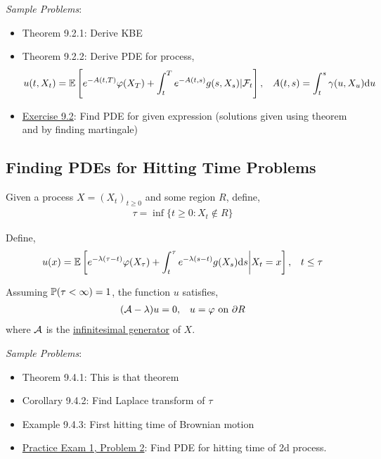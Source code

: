 \documentclass[12pt]{article}
\begin{document}
\textit{Sample Problems}:
\begin{itemize}[nolistsep]
    \item Theorem 9.2.1: Derive KBE
    \item Theorem 9.2.2: Derive PDE for process,
        {\small
        \begin{align*}
            u(t,X_t) = \mathbb{E} \left[ e^{-A(t,T)}\varphi(X_T) + \int_t^T e^{-A(t,s)}g(s,X_s) | \mathcal{F}_t \right], && A(t,s) = \int_t^s \gamma(u,X_u)\mathrm{d} u
        \end{align*}
        }
    \item \hyperref[Exercise 9.2]{Exercise 9.2}: Find PDE for given expression (solutions given using theorem and by finding martingale)
\end{itemize}


\subsection{Finding PDEs for Hitting Time Problems}
Given a process \( X = (X_t)_{t\geq 0} \) and some region \( R \), define,
\begin{align*}
    \tau = \operatorname{inf}\{t \geq 0 : X_t \notin R \}
\end{align*}

Define,
\begin{align*}
    u(x) = \mathbb{E} \left[ e^{-\lambda(\tau - t)} \varphi(X_\tau) + \int_t^\tau e^{-\lambda(s-t)}g(X_s)\mathrm{d} s \bigg| X_t = x \right], && t \leq \tau 
\end{align*}

Assuming \( \mathbb{P}(\tau < \infty) = 1 \), the function \( u \) satisfies,
\begin{align*}
    (\mathcal{A} - \lambda) u = 0, && u = \varphi \text{ on }\partial R
\end{align*}
where \( \mathcal{A} \) is the \hyperref[sec:infgen]{infinitesimal generator} of \( X \).

\textit{Sample Problems}:
\begin{itemize}[nolistsep]
    \item Theorem 9.4.1: This is that theorem
    \item Corollary 9.4.2: Find Laplace transform of \( \tau \)
    \item Example 9.4.3: First hitting time of Brownian motion
    \item \hyperref[Practice Exam 1, Problem 2]{Practice Exam 1, Problem 2}: Find PDE for hitting time of 2d process.
\end{itemize}
\end{document}
